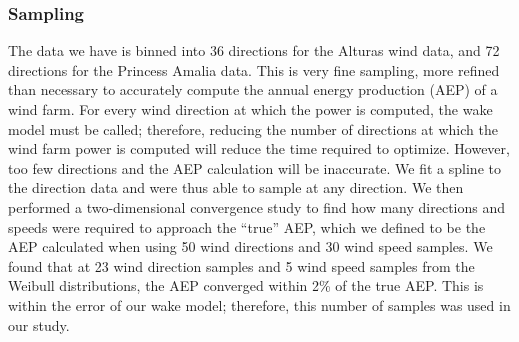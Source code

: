\subsubsection{Sampling}
The data we have is binned into 36 directions for the Alturas wind data, and 72 directions for the Princess Amalia data. This is very fine sampling, 
more refined than necessary to accurately compute the annual energy production (AEP) of a wind farm. 
For every wind direction at which the power is computed, the wake model must be called; therefore, reducing the number of directions at which the wind farm power is computed will reduce the time required to optimize. 
However, too few directions and the AEP calculation will be inaccurate. We fit a spline to the direction data and were thus able to sample at any direction. We then performed a two-dimensional convergence study to find how many directions and speeds were required to approach the ``true'' AEP, which we defined to be the AEP calculated when using 50 wind directions and 30 wind speed samples. 
We found that at 23 wind direction samples and 5 wind speed samples from the Weibull distributions, the AEP converged within 2\% of the true AEP. This is within the error of our wake model; therefore, this number of samples was used in our study. 
